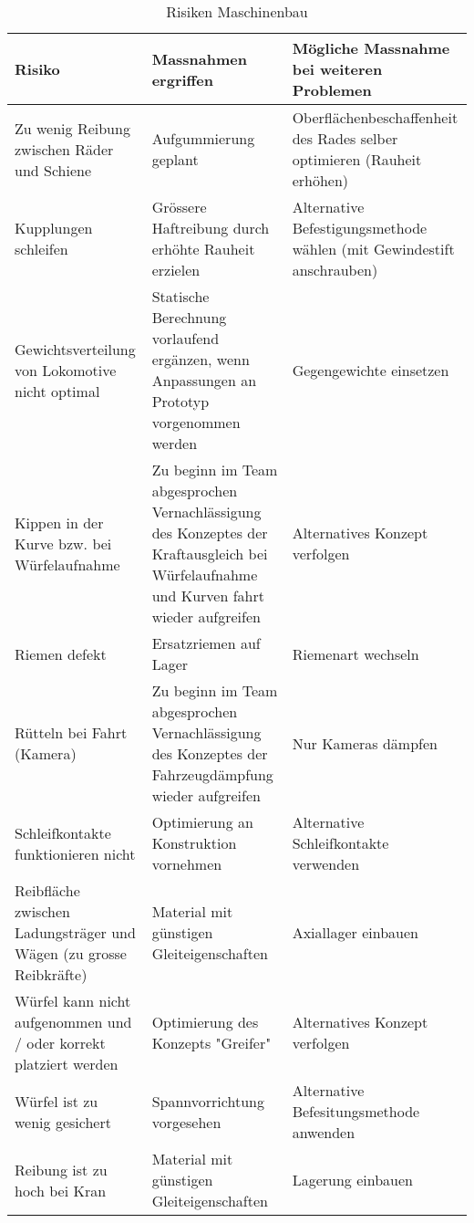 \documentclass[../../main.tex]{subfiles}
\begin{document}
    \begin{table}[H]
        \begin{tabular}{|p{}|p{}|p{}|}
        \hline
        \textbf{Risiko}   & \textbf{Massnahmen ergriffen}                                                                                   & \textbf{Mögliche Massnahme bei weiteren Problemen} \\ \hline
        Zu wenig Reibung zwischen Räder und Schiene & Aufgummierung geplant & Oberflächenbeschaffenheit des Rades selber optimieren (Rauheit erhöhen) \\ \hline
        Kupplungen schleifen & Grössere Haftreibung durch erhöhte Rauheit erzielen & Alternative Befestigungsmethode wählen (mit Gewindestift anschrauben) \\ \hline
        Gewichtsverteilung von Lokomotive nicht optimal & Statische Berechnung vorlaufend ergänzen, wenn Anpassungen an Prototyp vorgenommen werden & Gegengewichte einsetzen \\ \hline
        Kippen in der Kurve bzw. bei Würfelaufnahme & Zu beginn im Team abgesprochen Vernachlässigung des Konzeptes der Kraftausgleich bei Würfelaufnahme und Kurven fahrt wieder aufgreifen & Alternatives Konzept verfolgen \\ \hline
        Riemen defekt & Ersatzriemen auf Lager & Riemenart wechseln \\ \hline
        Rütteln bei Fahrt (Kamera) & Zu beginn im Team abgesprochen Vernachlässigung des Konzeptes der Fahrzeugdämpfung wieder aufgreifen & Nur Kameras dämpfen \\ \hline
        Schleifkontakte funktionieren nicht & Optimierung an Konstruktion vornehmen & Alternative Schleifkontakte verwenden \\ \hline
        Reibfläche zwischen Ladungsträger und Wägen (zu grosse Reibkräfte) & Material mit günstigen Gleiteigenschaften &  Axiallager einbauen\\ \hline
        Würfel kann nicht aufgenommen und / oder korrekt platziert werden & Optimierung des Konzepts "Greifer" &  Alternatives Konzept verfolgen\\ \hline
        Würfel ist zu wenig gesichert & Spannvorrichtung vorgesehen &  Alternative Befesitungsmethode anwenden\\ \hline
        Reibung ist zu hoch bei Kran & Material mit günstigen Gleiteigenschaften &  Lagerung einbauen\\ \hline
        \end{tabular}
        \caption{Risiken Maschinenbau}
        \label{tab:risk_M}
        \end{table}
\end{document}
